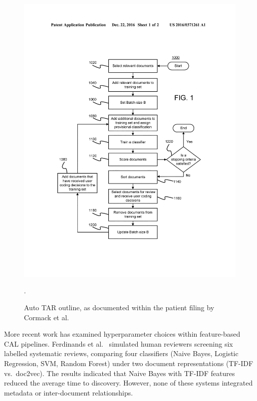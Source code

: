 \documentclass[10pt,oneside]{book}
\begin{document}
\begin{figure}
    \centering
    \includegraphics[width=1\linewidth]{images/autotar.jpg}
    \caption{Auto TAR outline, as documented within the patient filing by Cormack et al. \cite{cormack_systems_2016}}.
    \label{fig:autotar_process}
\end{figure}

More recent work has examined hyperparameter choices within feature-based CAL pipelines. Ferdinands et al.~\cite{ferdinands_performance_2023} simulated human reviewers screening six labelled systematic reviews, comparing four classifiers (Naive Bayes, Logistic Regression, SVM, Random Forest) under two document representations (TF-IDF vs.\ doc2vec). The results indicated that Naive Bayes with TF-IDF features reduced the average time to discovery. However, none of these systems integrated metadata or inter-document relationships.
\end{document}
